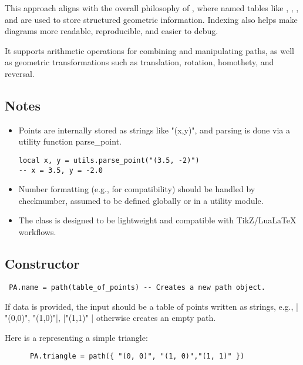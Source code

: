 This approach aligns with the overall philosophy of , where named tables like , , , and  are used to store structured geometric information. Indexing also helps make diagrams more readable, reproducible, and easier to debug.


It supports arithmetic operations for combining and manipulating paths, as well as geometric transformations such as translation, rotation, homothety, and reversal.

\subsection{Notes}

\begin{itemize}
\item Points are internally stored as strings like "(x,y)", and parsing is done via a utility function parse\_point.

\begin{verbatim}
local x, y = utils.parse_point("(3.5, -2)")
-- x = 3.5, y = -2.0
\end{verbatim}


\item Number formatting (e.g., for \TIKZ{} compatibility) should be handled by checknumber, assumed to be defined globally or in a utility module.

\item The class is designed to be lightweight and compatible with TikZ/LuaLaTeX workflows.

\end{itemize}

\subsection{Constructor}

\begin{center}
  \begin{verbatim}
 PA.name = path(table_of_points) -- Creates a new path object.
  \end{verbatim}
\end{center}


If data is provided, the input should be a table of points written as strings, e.g., |{ "(0,0)", "(1,0)"|, |"(1,1)" }| otherwise creates an empty path.

Here is a  representing a simple triangle:

  \begin{mybox}
    \begin{verbatim}
      PA.triangle = path({ "(0, 0)", "(1, 0)","(1, 1)" })
    \end{verbatim}
  \end{mybox}



